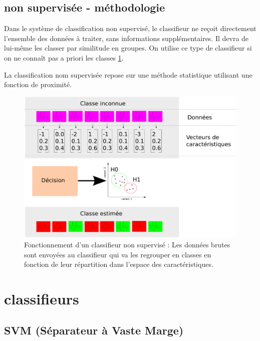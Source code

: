 		\subsection{non supervisée - méthodologie}

Dans le système de classification non supervisé, le classifieur ne reçoit directement l'ensemble des données à traiter, sans informations supplémentaires. Il devra de lui-même les classer par similitude en groupes. On utilise ce type de classifieur si on ne connaît pas a priori les classes \ref{fig:fonctionnementClassifNonSup}.

La classification nom supervisée repose sur une méthode statistique utilisant une fonction de proximité.

\begin{figure}[h]
	\label{fig:fonctionnementClassifNonSup}
	\begin{center}
	\includegraphics[width=15cm]{images/fonctionnementClassifNonSup}
	\end{center}
	\caption{Fonctionnement d'un classifieur non supervisé : Les données brutes sont envoyées au classifieur qui va les regrouper en classes en fonction de leur répartition dans l'espace des caractéristiques.}
\end{figure}

	\section{classifieurs}

		\subsection{SVM (Séparateur à Vaste Marge)}

